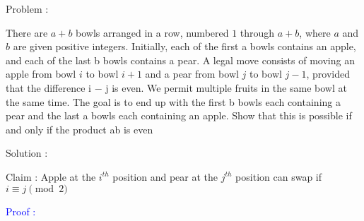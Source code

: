 Problem :

There are $a + b$ bowls arranged in a row, numbered $1$ through $a + b$, where $a$ and
$b$ are given positive integers. Initially, each of the first a bowls contains an apple,
and each of the last b bowls contains a pear. A legal move consists of moving an
apple from bowl $i$ to bowl $i + 1$ and a pear from bowl $j$ to bowl $j − 1$, provided that
the difference i − j is even. We permit multiple fruits in the same bowl at the same
time. The goal is to end up with the first b bowls each containing a pear and the
last a bowls each containing an apple. Show that this is possible if and only if the
product ab is even

Solution :

Claim : Apple at the $i^{th}$ position and pear at the $j^{th}$ position can swap if $i \equiv j \pmod{2} $


\textcolor{blue}{Proof :}

